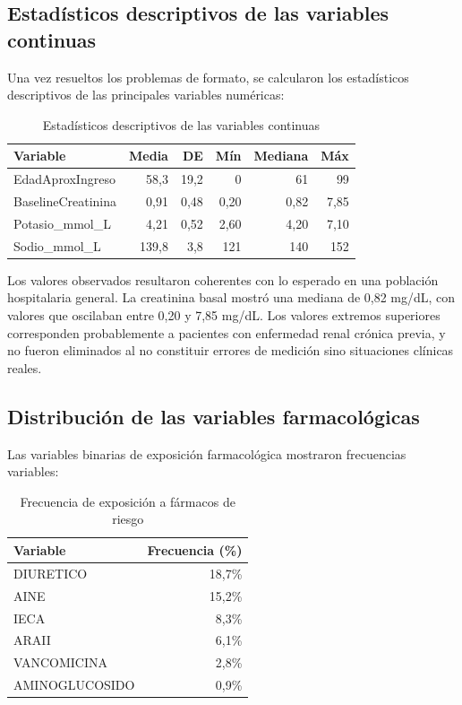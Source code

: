 \documentclass[12pt, a4paper, oneside]{report}
\begin{document}
\subsection{Estadísticos descriptivos de las variables continuas}

Una vez resueltos los problemas de formato, se calcularon los estadísticos descriptivos de las principales variables numéricas:

\begin{table}[h]
\centering
\begin{tabular}{lrrrrr}
\hline
\textbf{Variable} & \textbf{Media} & \textbf{DE} & \textbf{Mín} & \textbf{Mediana} & \textbf{Máx} \\
\hline
EdadAproxIngreso & 58,3 & 19,2 & 0 & 61 & 99 \\
BaselineCreatinina & 0,91 & 0,48 & 0,20 & 0,82 & 7,85 \\
Potasio\_mmol\_L & 4,21 & 0,52 & 2,60 & 4,20 & 7,10 \\
Sodio\_mmol\_L & 139,8 & 3,8 & 121 & 140 & 152 \\
\hline
\end{tabular}
\caption{Estadísticos descriptivos de las variables continuas}
\label{tab:descriptivos}
\end{table}

Los valores observados resultaron coherentes con lo esperado en una población hospitalaria general. La creatinina basal mostró una mediana de 0,82 mg/dL, con valores que oscilaban entre 0,20 y 7,85 mg/dL. Los valores extremos superiores corresponden probablemente a pacientes con enfermedad renal crónica previa, y no fueron eliminados al no constituir errores de medición sino situaciones clínicas reales.

\subsection{Distribución de las variables farmacológicas}

Las variables binarias de exposición farmacológica mostraron frecuencias variables:

\begin{table}[h]
\centering
\begin{tabular}{lr}
\hline
\textbf{Variable} & \textbf{Frecuencia (\%)} \\
\hline
DIURETICO & 18,7\% \\
AINE & 15,2\% \\
IECA & 8,3\% \\
ARAII & 6,1\% \\
VANCOMICINA & 2,8\% \\
AMINOGLUCOSIDO & 0,9\% \\
\hline
\end{tabular}
\caption{Frecuencia de exposición a fármacos de riesgo}
\label{tab:farmacos}
\end{table}
\end{document}
